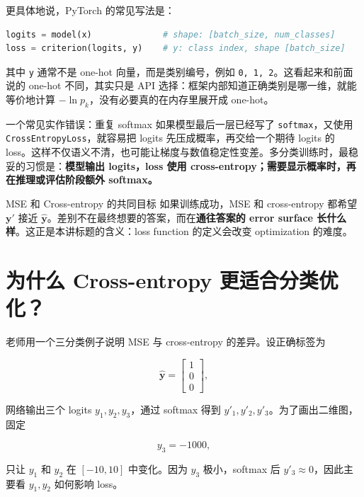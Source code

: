 \documentclass[a4paper]{article}
\begin{document}
更具体地说，PyTorch 的常见写法是：

\begin{lstlisting}[language=Python]
logits = model(x)              # shape: [batch_size, num_classes]
loss = criterion(logits, y)    # y: class index, shape [batch_size]
\end{lstlisting}

其中 \texttt{y} 通常不是 one-hot 向量，而是类别编号，例如 \texttt{0, 1, 2}。这看起来和前面说的 one-hot 不同，其实只是 API 选择：框架内部知道正确类别是哪一维，就能等价地计算 $-\ln p_k$，没有必要真的在内存里展开成 one-hot。

\begin{warningbox}{一个常见实作错误：重复 softmax}
    如果模型最后一层已经写了 \texttt{softmax}，又使用 \texttt{CrossEntropyLoss}，就容易把 logits 先压成概率，再交给一个期待 logits 的 loss。这样不仅语义不清，也可能让梯度与数值稳定性变差。多分类训练时，最稳妥的习惯是：\textbf{模型输出 logits，loss 使用 cross-entropy；需要显示概率时，再在推理或评估阶段额外 softmax。}
\end{warningbox}

\begin{importantbox}{MSE 和 Cross-entropy 的共同目标}
    如果训练成功，MSE 和 cross-entropy 都希望 $\boldsymbol{y}'$ 接近 $\hat{\boldsymbol{y}}$。差别不在最终想要的答案，而在\textbf{通往答案的 error surface 长什么样}。这正是本讲标题的含义：loss function 的定义会改变 optimization 的难度。
\end{importantbox}

\section{为什么 Cross-entropy 更适合分类优化？}

老师用一个三分类例子说明 MSE 与 cross-entropy 的差异。设正确标签为

\[
    \hat{\boldsymbol{y}}=\begin{bmatrix}1\\0\\0\end{bmatrix},
\]

网络输出三个 logits $y_1,y_2,y_3$，通过 softmax 得到 $y'_1,y'_2,y'_3$。为了画出二维图，固定

\[
    y_3=-1000,
\]

只让 $y_1$ 和 $y_2$ 在 $[-10,10]$ 中变化。因为 $y_3$ 极小，softmax 后 $y'_3\approx 0$，因此主要看 $y_1,y_2$ 如何影响 loss。
\end{document}
